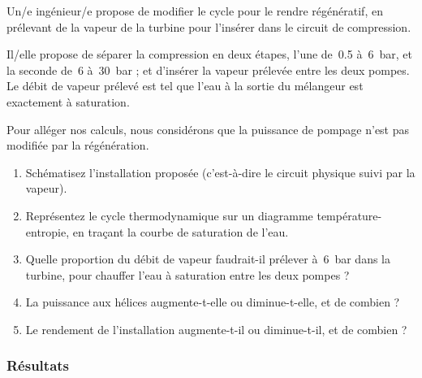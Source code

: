 	Un/e ingénieur/e propose de modifier le cycle pour le rendre régénératif, en prélevant de la vapeur de la turbine pour l’insérer dans le circuit de compression.
	
	Il/elle propose de séparer la compression en deux étapes, l’une de~\num{0,5} à~\SI{6}{\bar}, et la seconde de~\num{6} à~\SI{30}{\bar} ; et d’insérer la vapeur prélevée entre les deux pompes. Le débit de vapeur prélevé est tel que l’eau à la sortie du mélangeur est exactement à saturation.
	
	Pour alléger nos calculs, nous considérons que la puissance de pompage n’est pas modifiée par la régénération.
	
	\begin{enumerate}	
		\item Schématisez l’installation proposée (c’est-à-dire le circuit physique suivi par la vapeur).
		\item Représentez le cycle thermodynamique sur un diagramme température-entropie, en traçant la courbe de saturation de l’eau.
		\item Quelle proportion du débit de vapeur faudrait-il prélever à~\SI{6}{\bar} dans la turbine, pour chauffer l’eau à saturation entre les deux pompes ?
		\item La puissance aux hélices augmente-t-elle ou diminue-t-elle, et de combien ?
		\item Le rendement de l’installation augmente-t-il ou diminue-t-il, et de combien ?
	\end{enumerate}

\exercisesolutionpage
\subsubsection*{Résultats}
	\linktosolutionsblurb
	
